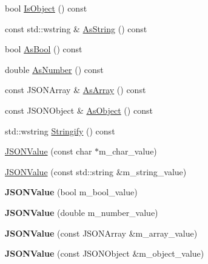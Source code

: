 \begin{DoxyCompactItemize}
bool \hyperlink{classJSONValue_a82d2d60f92bb5d9803c40d51eb8749ff}{\-Is\-Object} () const 
\item 
const std\-::wstring \& \hyperlink{classJSONValue_ad8204ac1bb7b460706cc83664c049da1}{\-As\-String} () const 
\item 
bool \hyperlink{classJSONValue_a56af7863b4a860979259d9a426580b32}{\-As\-Bool} () const 
\item 
double \hyperlink{classJSONValue_ab0ff732d7c1c4017295313919fa571fa}{\-As\-Number} () const 
\item 
const \-J\-S\-O\-N\-Array \& \hyperlink{classJSONValue_a62f36548b0f0d25d72c41058d8216226}{\-As\-Array} () const 
\item 
const \-J\-S\-O\-N\-Object \& \hyperlink{classJSONValue_abaaba0f72daa1a4a75b07c4ba6d185fc}{\-As\-Object} () const 
\item 
std\-::wstring \hyperlink{classJSONValue_a661d8d6eefb3e692c9f75dfb3e96e717}{\-Stringify} () const 
\item 
\hyperlink{classJSONValue_acf94f34e1fc0f01064951c17461d63c9}{\-J\-S\-O\-N\-Value} (const char $\ast$m\-\_\-char\-\_\-value)
\item 
\hyperlink{classJSONValue_a501f04137258c93343a0c6815c3ca96b}{\-J\-S\-O\-N\-Value} (const std\-::string \&m\-\_\-string\-\_\-value)
\item 
\hypertarget{classJSONValue_aafcc30e3701ee1d34d54793810929518}{{\bfseries \-J\-S\-O\-N\-Value} (bool m\-\_\-bool\-\_\-value)}\label{classJSONValue_aafcc30e3701ee1d34d54793810929518}

\item 
\hypertarget{classJSONValue_a07cea2c451d953c4e7767edc845cf6b1}{{\bfseries \-J\-S\-O\-N\-Value} (double m\-\_\-number\-\_\-value)}\label{classJSONValue_a07cea2c451d953c4e7767edc845cf6b1}

\item 
\hypertarget{classJSONValue_a65bd13526af5f626d0c498109dcc52aa}{{\bfseries \-J\-S\-O\-N\-Value} (const \-J\-S\-O\-N\-Array \&m\-\_\-array\-\_\-value)}\label{classJSONValue_a65bd13526af5f626d0c498109dcc52aa}

\item 
\hypertarget{classJSONValue_a2f1580969809665bd204dca3774226f5}{{\bfseries \-J\-S\-O\-N\-Value} (const \-J\-S\-O\-N\-Object \&m\-\_\-object\-\_\-value)}\label{classJSONValue_a2f1580969809665bd204dca3774226f5}


\end{DoxyCompactItemize}
